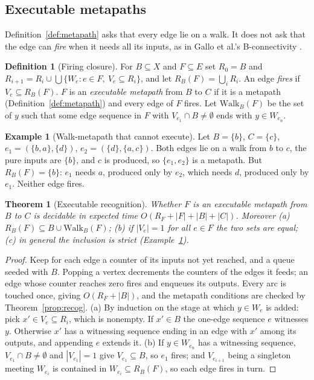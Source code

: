 \documentclass[11pt]{article}
\theoremstyle{plain}
\newtheorem{theorem}{Theorem}
\theoremstyle{definition}
\newtheorem{definition}{Definition}
\newtheorem{example}{Example}
\theoremstyle{remark}
\begin{document}
\subsection{Executable metapaths}
Definition~\ref{def:metapath} asks that every edge lie on a walk. It does not ask that
the edge can \emph{fire} when it needs all its inputs, as in Gallo et al.'s B-connectivity
\cite{gallo1993directed}.
\begin{definition}[Firing closure]\label{def:fire}
For $B\subseteq X$ and $F\subseteq E$ set $R_0=B$ and
$R_{i+1}=R_i\cup\bigcup\{W_e:e\in F,\ V_e\subseteq R_i\}$, and let $R_B(F)=\bigcup_iR_i$.
An edge \emph{fires} if $V_e\subseteq R_B(F)$. $F$ is an \emph{executable metapath} from
$B$ to $C$ if it is a metapath (Definition~\ref{def:metapath}) and every edge of $F$ fires.
Let $\mathrm{Walk}_B(F)$ be the set of $y$ such that some edge sequence in $F$ with
$V_{e_1}\cap B\neq\emptyset$ ends with $y\in W_{e_n}$.
\end{definition}
\begin{example}[Walk-metapath that cannot execute]\label{ex:gap}
Let $B=\{b\}$, $C=\{c\}$, $e_1=(\{b,a\},\{d\})$, $e_2=(\{d\},\{a,c\})$. Both edges lie on a
walk from $b$ to $c$, the pure inputs are $\{b\}$, and $c$ is produced, so
$\{e_1,e_2\}$ is a metapath. But $R_B(F)=\{b\}$: $e_1$ needs $a$, produced only by $e_2$,
which needs $d$, produced only by $e_1$. Neither edge fires.
\end{example}
\begin{theorem}[Executable recognition]\label{thm:exec}
Whether $F$ is an executable metapath from $B$ to $C$ is decidable in expected time
$O(R_F+|F|+|B|+|C|)$. Moreover (a) $R_B(F)\subseteq B\cup\mathrm{Walk}_B(F)$; (b) if $|V_e|=1$ for all
$e\in F$ the two sets are equal; (c) in general the inclusion is strict
(Example~\ref{ex:gap}).
\end{theorem}
\begin{proof}
Keep for each edge a counter of its inputs not yet reached, and a queue seeded with $B$.
Popping a vertex decrements the counters of the edges it feeds; an edge whose counter
reaches zero fires and enqueues its outputs. Every arc is touched once, giving
$O(R_F+|B|)$, and the metapath conditions are checked by Theorem~\ref{prop:recog}.
(a) By induction on the stage at which $y\in W_e$ is added: pick $x'\in V_e\subseteq R_i$,
which is nonempty. If $x'\in B$ the one-edge sequence $e$ witnesses $y$. Otherwise $x'$ has a
witnessing sequence ending in an edge with $x'$ among its outputs, and appending $e$
extends it. (b) If $y\in W_{e_n}$ has a witnessing sequence, $V_{e_1}\cap B\ne\emptyset$ and
$|V_{e_1}|=1$ give $V_{e_1}\subseteq B$, so $e_1$ fires; and $V_{e_{i+1}}$ being a singleton
meeting $W_{e_i}$ is contained in $W_{e_i}\subseteq R_B(F)$, so each edge fires in turn.
\end{proof}
\end{document}

